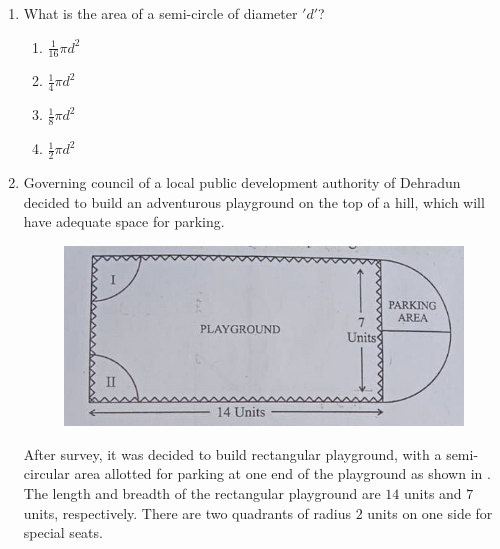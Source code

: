 %
\begin{enumerate}

    \item What is the area of a semi-circle of diameter $'d'$?
    
    \begin{enumerate}
        \item $\frac{1}{16}\pi d^2$ \item $\frac{1}{4}\pi d^2$ \item $\frac{1}{8}\pi d^2$ \item $\frac{1}{2}\pi d^2$
    \end{enumerate}


    \item Governing council of a local public development authority of Dehradun decided to build an adventurous playground on the top of a hill, which will have adequate space for parking.
    
    \begin{figure}[!ht]
    \centering
    \includegraphics[width=\columnwidth]{figs/fig.png}
    \caption{}
    \label{fig:figure1}
\end{figure}
After survey, it was decided to build rectangular playground, with a semi-circular area allotted for parking at one end of the playground as shown in . The length and breadth of the rectangular playground are $14$ units and $7$ units, respectively. There are two quadrants of radius $2$ units on one side for special seats.


\end{enumerate}

